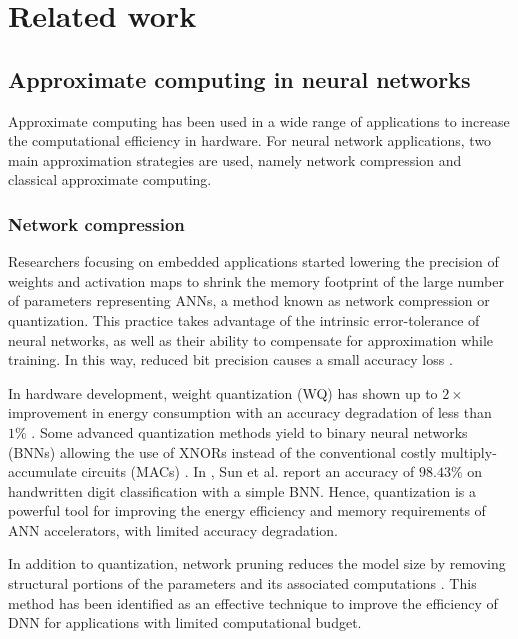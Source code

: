 \section{Related work}
\label{sec:related_work}
\subsection{Approximate computing in neural networks}
Approximate computing has been used in a wide range of applications to increase the computational efficiency in hardware\cite{han2013approximate}. For neural network applications, two main approximation strategies are used, namely network compression and classical approximate computing\cite{bouvier2019spiking}.

\subsubsection{Network compression}
Researchers focusing on embedded applications started lowering the precision of weights and activation maps to shrink the memory footprint of the large number of parameters representing ANNs, a method known as network compression or quantization. This practice takes advantage of the intrinsic error-tolerance of neural networks, as well as their ability to compensate for approximation while training. In this way, reduced bit precision causes a small accuracy loss \cite{courbariaux2015binaryconnect, han2015deep, hubara2017quantized, rastegari2016xnor}.

In hardware development, weight quantization (WQ) has shown up to $2\times$ improvement in energy consumption with an accuracy degradation of less than $1\%$ \cite{moons20160, whatmough201714}. Some advanced quantization methods yield to binary neural networks (BNNs) allowing the use of XNORs instead of the conventional costly multiply-accumulate circuits (MACs) \cite{rastegari2016xnor}. In \cite{sun2018xnor}, Sun et al. report an accuracy of $98.43\%$ on handwritten digit classification with a simple BNN. Hence, quantization is a powerful tool for improving the energy efficiency and memory requirements of ANN accelerators, with limited accuracy degradation.

In addition to quantization, network pruning reduces the model size by removing structural portions of the parameters and its associated computations \cite{lecun1989optimal,hassibi1992second,han2015learning}. This method has been identified as an effective technique to improve the efficiency of DNN for applications with limited computational budget\cite{molchanov2016pruning,li2016pruning, liu2018rethinking}.

